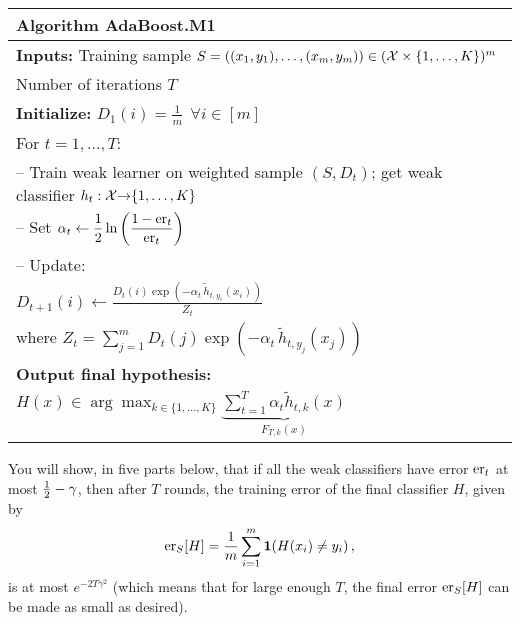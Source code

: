 \begin{center}
\begin{tabular}{l}
\hline
Algorithm \textbf{AdaBoost.M1} \rule{0pt}{12pt} \\
\hline
\textbf{Inputs:} Training sample $S=((x_1,y_1),\ldots,(x_m,y_m))\in({\mathcal X}\times\{1,\ldots,K\})^m$ \rule{0pt}{12pt} \\
\quad\quad\quad\quad Number of iterations $T$ \\[2pt]
\textbf{Initialize:} $D_1(i) = \frac{1}{m} ~~\forall i \in [m]$ \\[2pt]
For $t=1,\ldots,T$:\\
\quad-- Train weak learner on weighted sample $(S,D_t)$; get weak classifier $h_t:{\mathcal X}{\rightarrow}\{1,\ldots,K\}$ \\[3pt]  %
\quad-- Set $\alpha_t \leftarrow \displaystyle{\frac{1}{2}} \ln\bigg( \displaystyle{\frac{1-\textup{\textrm{er}}_t}{\textup{\textrm{er}}_t}} \bigg)$ \\
\quad-- Update:\\
\quad\quad\quad\quad $D_{t+1}(i) \leftarrow \displaystyle{\frac{D_t(i)\exp(-\alpha_t \, \tilde{h}_{t,y_i}(x_i))}{Z_t}}$ \\[10pt]
\quad\quad where $Z_t = {\sum_{j=1}^m D_t(j) \exp(-\alpha_t \, \tilde{h}_{t,y_j}(x_j))}$ \\[8pt]
\textbf{Output final hypothesis:} \\
\quad\quad\quad 
$H(x) \in \arg\max_{k\in\{1,\ldots,K\}} \underbrace{\sum_{t=1}^T \alpha_t \tilde{h}_{t,k}(x)}_{F_{T,k}(x)} $ \\[2pt]
\hline
\end{tabular}
\end{center}
%
You will show, in five parts below, 
that if all the weak classifiers have error $\textup{\textrm{er}}_t$ at most $\frac{1}{2}-\gamma$, then after $T$ rounds,
the training error of the final classifier $H$, given by 
\[
\textup{\textrm{er}}_S[H] = \frac{1}{m} \sum_{i=1}^m {\mathbf 1}(H(x_i)\neq y_i)
	\,,
\]
is at most $e^{-2T\gamma^2}$ (which means that for large enough $T$, the final error $\textup{\textrm{er}}_S[H]$ can be made as small as desired).
%

